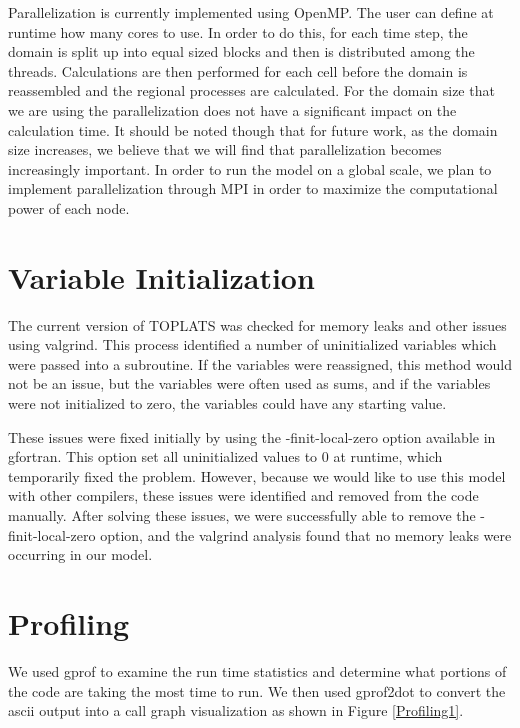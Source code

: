 \documentclass[pdftex,12pt,a4paper]{article}
\begin{document}
Parallelization is currently implemented using OpenMP. The user can define at runtime how many cores to use. In order to do this, for each time step, the domain is split up into equal sized blocks and then is distributed among the threads. Calculations are then performed for each cell before the domain is reassembled and the regional processes are calculated. For the domain size that we are using the parallelization does not have a significant impact on the calculation time. It should be noted though that for future work, as the domain size increases, we believe that we will find that parallelization becomes increasingly important. In order to run the model on a global scale, we plan to implement parallelization through MPI in order to maximize the computational power of each node.

\section{Variable Initialization}
The current version of TOPLATS was checked for memory leaks and other issues using valgrind. This process identified a number of uninitialized variables which were passed into a subroutine. If the variables were reassigned, this method would not be an issue, but the variables were often used as sums, and if the variables were not initialized to zero, the variables could have any starting value. 

These issues were fixed initially by using the -finit-local-zero option available in gfortran. This option set all uninitialized values to 0 at runtime, which temporarily fixed the problem. However, because we would like to use this model with other compilers, these issues were identified and removed from the code manually. After solving these issues, we were successfully able to remove the -finit-local-zero option, and the valgrind analysis found that no memory leaks were occurring in our model.

\section{Profiling}

We used gprof to examine the run time statistics and determine what portions of the code are taking the most time to run. We then used gprof2dot to convert the ascii output into a call graph visualization as shown in Figure \ref{Profiling1}. 
\end{document}
